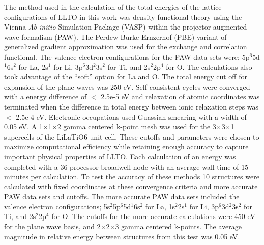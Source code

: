 \documentclass[aps,pre,reprint,superscriptaddress,showkeys]{revtex4-1}
\begin{document}
The method used in the calculation of the total energies of the lattice configurations of LLTO in this work was density functional theory using the Vienna \textit{Ab-initio} Simulation Package (VASP) \cite{Vasp1,Vasp2,Vasp3,Vasp4} within the projector augmented wave formalism (PAW)\cite{Blochl}. The Perdew-Burke-Ernzerhof (PBE) variant of generalized gradient approximation was used for the exchange and correlation functional\cite{PBE}. The valence electron configurations for the PAW data sets were; 5p$^{6}$5d$^{1}$6s$^{2}$ for La, 2s$^{1}$ for Li, 3p$^{6}$3d$^{2}$3s$^{2}$ for Ti, and 2s$^{2}$2p$^{4}$ for O. The calculations also took advantage of the ``soft'' option for La and O.   The total energy cut off for expansion of the plane waves was 250 eV.  Self consistent cycles were converged with a energy difference of $<$ 2.5e-5 eV and relaxation  of atomic coordinates was terminated when the difference in total energy between ionic relaxation steps was $<$ 2.5e-4 eV. Electronic occupations used Guassian smearing with a width of 0.05 eV.  A 1$\times$1$\times$2 gamma centered k-point mesh was used for the 3$\times$3$\times$1 supercells of the LiLaTiO6 unit cell. These cutoffs and parameters were chosen to maximize computational efficiency while retaining enough accuracy to capture important physical properties of LLTO.  Each calculation of an energy was completed with a 36 processor broadwell node with an average wall time of 15 minutes per calculation.  To test the accuracy of these methods 10 structures were calculated with fixed coordinates at these convergence criteria and more accurate PAW data sets and cutoffs. The more accurate PAW data sets included the valence electron configurations; 5s$^{2}$5p$^{6}$5d$^{1}$6s$^{2}$ for La, 1s$^2$2s$^{1}$ for Li, 3p$^{6}$3d$^{2}$3s$^{2}$ for Ti, and 2s$^{2}$2p$^{4}$ for O.  The cutoffs for the more accurate calculations were 450 eV for the plane wave basis, and 2$\times$2$\times$3 gamma centered k-points. The average magnitude  in relative energy between structures from this test was 0.05 eV. 
\end{document}
